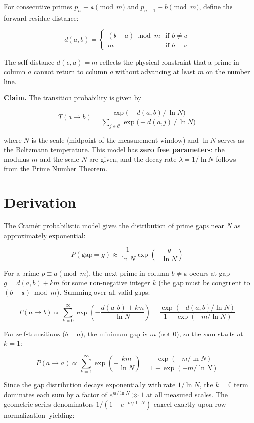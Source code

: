 \documentclass[
  11pt,
]{article}
\begin{document}
For consecutive primes \(p_n \equiv a \pmod{m}\) and
\(p_{n+1} \equiv b \pmod{m}\), define the forward residue distance:

\[d(a, b) = \begin{cases} (b - a) \bmod m & \text{if } b \neq a \\ m & \text{if } b = a \end{cases}\]

The self-distance \(d(a, a) = m\) reflects the physical constraint that
a prime in column \(a\) cannot return to column \(a\) without advancing
at least \(m\) on the number line.

\textbf{Claim.} The transition probability is given by

\[\boxed{T(a \to b) = \frac{\exp\!\bigl(-d(a,b) \,/\, \ln N\bigr)}{\displaystyle\sum_{j \in \mathcal{C}} \exp\!\bigl(-d(a,j) \,/\, \ln N\bigr)}}\]

where \(N\) is the scale (midpoint of the measurement window) and
\(\ln N\) serves as the Boltzmann temperature. This model has
\textbf{zero free parameters}: the modulus \(m\) and the scale \(N\) are
given, and the decay rate \(\lambda = 1/\ln N\) follows from the Prime
Number Theorem.

\section{Derivation}\label{sec:derivation}

The Cramér probabilistic model gives the distribution of prime gaps near
\(N\) as approximately exponential:

\[P(\text{gap} = g) \approx \frac{1}{\ln N} \exp\!\left(-\frac{g}{\ln N}\right)\]

For a prime \(p \equiv a \pmod{m}\), the next prime in column
\(b \neq a\) occurs at gap \(g = d(a,b) + km\) for some non-negative
integer \(k\) (the gap must be congruent to \((b-a) \bmod m\)). Summing
over all valid gaps:

\[P(a \to b) \propto \sum_{k=0}^{\infty} \exp\!\left(-\frac{d(a,b) + km}{\ln N}\right) = \frac{\exp(-d(a,b)/\ln N)}{1 - \exp(-m/\ln N)}\]

For self-transitions (\(b = a\)), the minimum gap is \(m\) (not \(0\)),
so the sum starts at \(k = 1\):

\[P(a \to a) \propto \sum_{k=1}^{\infty} \exp\!\left(-\frac{km}{\ln N}\right) = \frac{\exp(-m/\ln N)}{1 - \exp(-m/\ln N)}\]

Since the gap distribution decays exponentially with rate \(1/\ln N\),
the \(k = 0\) term dominates each sum by a factor of
\(e^{m/\ln N} \gg 1\) at all measured scales. The geometric series
denominators \(1/(1 - e^{-m/\ln N})\) cancel exactly upon
row-normalization, yielding:
\end{document}
